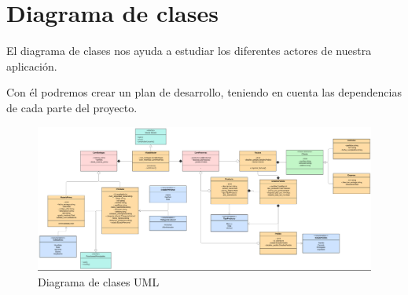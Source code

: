 \chapter{Diagrama de clases}

El diagrama de clases nos ayuda a estudiar los diferentes actores de nuestra aplicación.

Con él podremos crear un plan de desarrollo, teniendo en cuenta las dependencias de cada parte del proyecto.

\begin{figure}[h]
    \centering
    \includegraphics[width=1\textwidth]{figures/diagrama-clases.png}
    \caption{Diagrama de clases UML}
    \label{fig:clases}
\end{figure}
